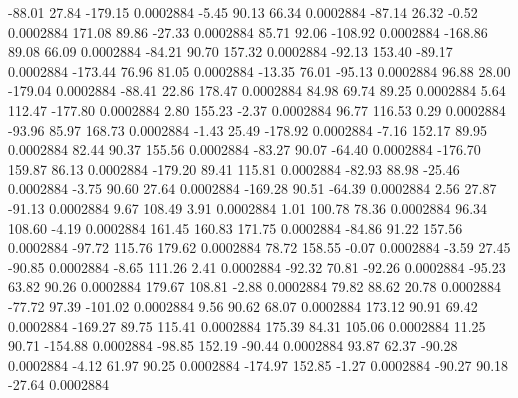       -88.01       27.84     -179.15     0.0002884
       -5.45       90.13       66.34     0.0002884
      -87.14       26.32       -0.52     0.0002884
      171.08       89.86      -27.33     0.0002884
       85.71       92.06     -108.92     0.0002884
     -168.86       89.08       66.09     0.0002884
      -84.21       90.70      157.32     0.0002884
      -92.13      153.40      -89.17     0.0002884
     -173.44       76.96       81.05     0.0002884
      -13.35       76.01      -95.13     0.0002884
       96.88       28.00     -179.04     0.0002884
      -88.41       22.86      178.47     0.0002884
       84.98       69.74       89.25     0.0002884
        5.64      112.47     -177.80     0.0002884
        2.80      155.23       -2.37     0.0002884
       96.77      116.53        0.29     0.0002884
      -93.96       85.97      168.73     0.0002884
       -1.43       25.49     -178.92     0.0002884
       -7.16      152.17       89.95     0.0002884
       82.44       90.37      155.56     0.0002884
      -83.27       90.07      -64.40     0.0002884
     -176.70      159.87       86.13     0.0002884
     -179.20       89.41      115.81     0.0002884
      -82.93       88.98      -25.46     0.0002884
       -3.75       90.60       27.64     0.0002884
     -169.28       90.51      -64.39     0.0002884
        2.56       27.87      -91.13     0.0002884
        9.67      108.49        3.91     0.0002884
        1.01      100.78       78.36     0.0002884
       96.34      108.60       -4.19     0.0002884
      161.45      160.83      171.75     0.0002884
      -84.86       91.22      157.56     0.0002884
      -97.72      115.76      179.62     0.0002884
       78.72      158.55       -0.07     0.0002884
       -3.59       27.45      -90.85     0.0002884
       -8.65      111.26        2.41     0.0002884
      -92.32       70.81      -92.26     0.0002884
      -95.23       63.82       90.26     0.0002884
      179.67      108.81       -2.88     0.0002884
       79.82       88.62       20.78     0.0002884
      -77.72       97.39     -101.02     0.0002884
        9.56       90.62       68.07     0.0002884
      173.12       90.91       69.42     0.0002884
     -169.27       89.75      115.41     0.0002884
      175.39       84.31      105.06     0.0002884
       11.25       90.71     -154.88     0.0002884
      -98.85      152.19      -90.44     0.0002884
       93.87       62.37      -90.28     0.0002884
       -4.12       61.97       90.25     0.0002884
     -174.97      152.85       -1.27     0.0002884
      -90.27       90.18      -27.64     0.0002884
